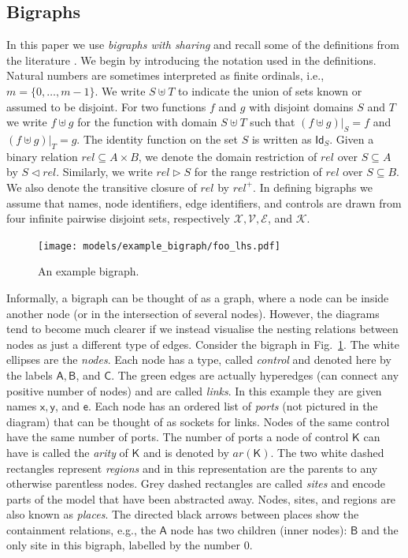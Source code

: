 \documentclass[runningheads]{llncs}
\newcommand\ar{\mathit{ar}}
\newcommand\Id{\mathsf{Id}}
\begin{document}
\subsection{Bigraphs}

In this paper we use \emph{bigraphs with sharing} and recall some of the
definitions from the literature
\cite{DBLP:phd/ethos/Sevegnani12,dblp:journals/tcs/sevegnanic15}. We begin by
introducing the notation used in the definitions. Natural numbers are sometimes
interpreted as finite ordinals, i.e., $m = \{ 0, \dots, m - 1 \}$. We write $S
\uplus T$ to indicate the union of sets known or assumed to be disjoint. For two
functions $f$ and $g$ with disjoint domains $S$ and $T$ we write $f \uplus g$
for the function with domain $S \uplus T$ such that $(f \uplus g)|_S = f$ and
$(f \uplus g)|_T = g$. The identity function on the set $S$ is written as
$\Id_S$. Given a binary relation $\mathit{rel} \subseteq A \times B$, we denote
the domain restriction of $\mathit{rel}$ over $S \subseteq A$ by $S \lhd
\mathit{rel}$. Similarly, we write $\mathit{rel} \rhd S$ for the range
restriction of $\mathit{rel}$ over $S \subseteq B$. We also denote the
transitive closure of $\mathit{rel}$ by $\mathit{rel}^+$. In defining bigraphs
we assume that names, node identifiers, edge identifiers, and controls are drawn
from four infinite pairwise disjoint sets, respectively $\mathcal{X},
\mathcal{V}, \mathcal{E}$, and $\mathcal{K}$.

\begin{figure}
  \centering
  \texttt{[image: models/example\_bigraph/foo\_lhs.pdf]}
  \caption{An example bigraph.}
  \label{example_bigraph}
\end{figure}

Informally, a bigraph can be thought of as a graph, where a node can be inside
another node (or in the intersection of several nodes). However, the diagrams
tend to become much clearer if we instead visualise the nesting relations
between nodes as just a different type of edges. Consider the bigraph in
Fig.~\ref{example_bigraph}. The white ellipses are the \emph{nodes}. Each node
has a type, called \emph{control} and denoted here by the labels $\mathsf{A},
\mathsf{B}$, and $\mathsf{C}$. The green edges are actually hyperedges (can
connect any positive number of nodes) and are called \emph{links}. In this
example they are given names $\mathsf{x}, \mathsf{y}$, and $\mathsf{e}$. Each
node has an ordered list of \emph{ports} (not pictured in the diagram) that can
be thought of as sockets for links. Nodes of the same control have the same
number of ports. The number of ports a node of control $\mathsf{K}$ can have is
called the \emph{arity} of $\mathsf{K}$ and is denoted by $\ar(\mathsf{K})$. The
two white dashed rectangles represent \emph{regions} and in this representation
are the parents to any otherwise parentless nodes. Grey dashed rectangles are
called \emph{sites} and encode parts of the model that have been abstracted
away. Nodes, sites, and regions are also known as \emph{places}. The directed
black arrows between places show the containment relations, e.g., the
$\mathsf{A}$ node has two children (inner nodes): $\mathsf{B}$ and the only site
in this bigraph, labelled by the number $0$.
\end{document}
